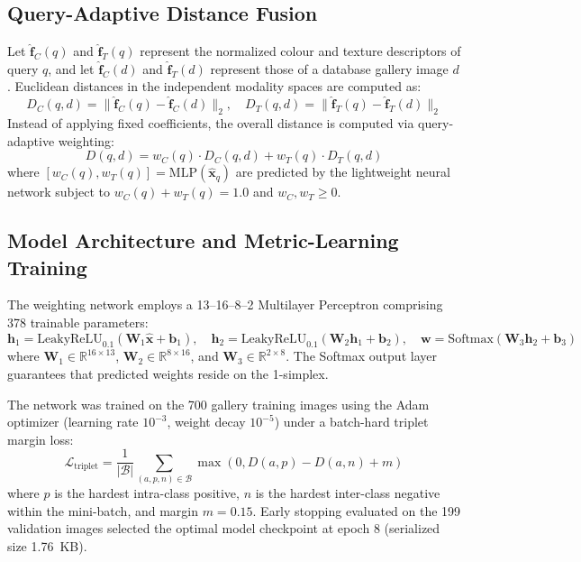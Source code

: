 \documentclass[pdflatex,sn-mathphys-num]{sn-jnl}
\begin{document}
\subsection{Query-Adaptive Distance Fusion}\label{subsec3.2}
Let $\hat{\mathbf{f}}_C(q)$ and $\hat{\mathbf{f}}_T(q)$ represent the normalized colour and texture descriptors of query $q$, and let $\hat{\mathbf{f}}_C(d)$ and $\hat{\mathbf{f}}_T(d)$ represent those of a database gallery image $d$. Euclidean distances in the independent modality spaces are computed as:
\begin{equation}
D_C(q, d) = \|\hat{\mathbf{f}}_C(q) - \hat{\mathbf{f}}_C(d)\|_2, \quad D_T(q, d) = \|\hat{\mathbf{f}}_T(q) - \hat{\mathbf{f}}_T(d)\|_2
\end{equation}
Instead of applying fixed coefficients, the overall distance is computed via query-adaptive weighting:
\begin{equation}
D(q, d) = w_C(q) \cdot D_C(q, d) + w_T(q) \cdot D_T(q, d)
\end{equation}
where $[w_C(q), w_T(q)] = \text{MLP}(\hat{\mathbf{x}}_q)$ are predicted by the lightweight neural network subject to $w_C(q) + w_T(q) = 1.0$ and $w_C, w_T \ge 0$.

\subsection{Model Architecture and Metric-Learning Training}\label{subsec3.3}
The weighting network employs a 13--16--8--2 Multilayer Perceptron comprising 378 trainable parameters:
\begin{equation}
\mathbf{h}_1 = \text{LeakyReLU}_{0.1}(\mathbf{W}_1 \hat{\mathbf{x}} + \mathbf{b}_1), \quad \mathbf{h}_2 = \text{LeakyReLU}_{0.1}(\mathbf{W}_2 \mathbf{h}_1 + \mathbf{b}_2), \quad \mathbf{w} = \text{Softmax}(\mathbf{W}_3 \mathbf{h}_2 + \mathbf{b}_3)
\end{equation}
where $\mathbf{W}_1 \in \mathbb{R}^{16 \times 13}$, $\mathbf{W}_2 \in \mathbb{R}^{8 \times 16}$, and $\mathbf{W}_3 \in \mathbb{R}^{2 \times 8}$. The Softmax output layer guarantees that predicted weights reside on the 1-simplex.

The network was trained on the 700 gallery training images using the Adam optimizer (learning rate $10^{-3}$, weight decay $10^{-5}$) under a batch-hard triplet margin loss:
\begin{equation}
\mathcal{L}_{\text{triplet}} = \frac{1}{|\mathcal{B}|}\sum_{(a,p,n) \in \mathcal{B}} \max\left(0, D(a, p) - D(a, n) + m\right)
\end{equation}
where $p$ is the hardest intra-class positive, $n$ is the hardest inter-class negative within the mini-batch, and margin $m = 0.15$. Early stopping evaluated on the 199 validation images selected the optimal model checkpoint at epoch 8 (serialized size 1.76~KB).
\end{document}
